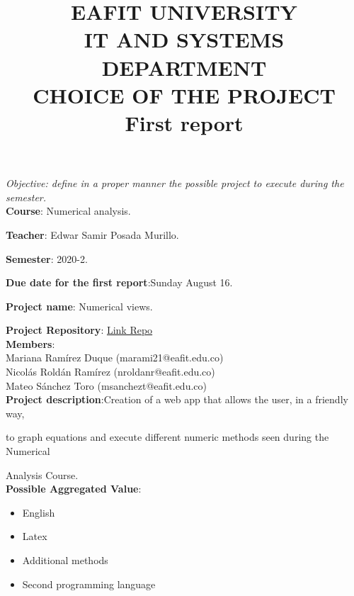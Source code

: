 \documentclass[letterpaper,12pt]{article}
\begin{document}
\title{EAFIT UNIVERSITY\\

IT AND SYSTEMS DEPARTMENT \\

CHOICE OF THE PROJECT \\


First report
\date{}
}

\maketitle


\textit{Objective: define in a proper manner the possible project to execute during the semester.}\\

\textbf{Course}: Numerical analysis.

\textbf{Teacher}: Edwar Samir Posada Murillo.

\textbf{Semester}: 2020-2.

\textbf{Due date for the first report}:Sunday August 16.

\textbf{Project name}: Numerical views.

\textbf{Project Repository}: \href{https://github.com/Sanchezt99/NumericalViews}{Link Repo} \\

\textbf{Members}:\\

Mariana Ramírez Duque (marami21@eafit.edu.co) \\

Nicolás Roldán Ramírez (nroldanr@eafit.edu.co) \\

Mateo Sánchez Toro (msanchezt@eafit.edu.co)\\


\textbf{Project description}:Creation of a web app that allows the user, in a friendly way, 

to  graph equations and execute different numeric methods seen during the Numerical 

Analysis Course. \\

\textbf{Possible Aggregated Value}:
\begin{itemize}
    \item English
    \item Latex
    \item Additional methods
    \item Second programming language 
\end{itemize}
\end{document}
